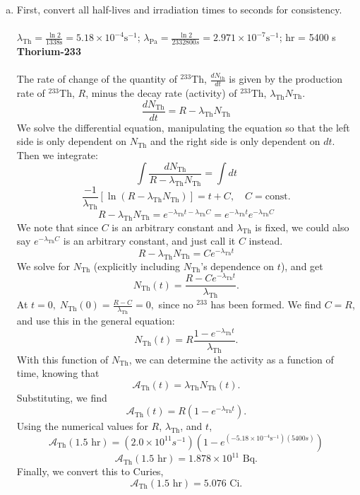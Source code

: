 \documentclass{report}
\begin{document}
\begin{enumerate}[a)]

\item

First, convert all half-lives and irradiation times to seconds for consistency.\\ 
\-\\
\tab $\lambda_{\text{Th}} = \frac{\ln{2}}{1338\text{s}} = 5.18\times10^{-4}\text{s}^{-1}$; \tab $\lambda_{\text{Pa}}=\frac{\ln{2}}{2332800s}=2.971\times10^{-7}\text{s}^{-1}$;  hr = 5400 s\\

\textbf{Thorium-233}\\
\-\\
The rate of change of the quantity of $^{233}$Th, $\frac{dN_{\text{th}}}{dt}$ is given by the production rate of $^{233}$Th, $R$, minus the decay rate (activity) of $^{233}$Th, $\lambda_{\text{Th}}N_{\text{Th}}$.
$$\frac{dN_{\text{Th}}}{dt} = R - \lambda_{\text{Th}}N_{\text{Th}}$$
We solve the differential equation, manipulating the equation so that the left side is only dependent on $N_{\text{Th}}$ and the right side is only dependent on $dt$. Then we integrate:
$$\int{\frac{dN_{\text{Th}}}{R-\lambda_{\text{Th}}N_{\text{Th}}}} = \int{dt}$$
$$\frac{-1}{\lambda_{\text{Th}}}[\ln(R-\lambda_{\text{Th}}N_{\text{Th}})] = t + C,\quad C=\text{const.}$$
$$R-\lambda_{\text{Th}}N_{\text{Th}} = e^{-\lambda_{\text{Th}}t -\lambda_{\text{Th}}C} = e^{-\lambda_{\text{Th}}t} e^{-\lambda_{\text{Th}}C}$$
We note that since $C$ is an arbitrary constant and $\lambda_{\text{Th}}$ is fixed, we could also say $e^{-\lambda_{\text{Th}}C}$ is an arbitrary constant, and just call it $C$ instead.
$$ R-\lambda_{\text{Th}}N_{\text{Th}} = Ce^{-\lambda_{\text{Th}}t} $$
We solve for $N_{\text{Th}}$ (explicitly including $N_{\text{Th}}$'s dependence on $t$), and get
$$ N_{\text{Th}}(t) = \frac{R - Ce^{-\lambda_{\text{Th}}t}}{\lambda_{\text{Th}}} .$$
At $t=0,\; N_{\text{Th}}(0) = \frac{R - C}{\lambda_{\text{Th}}}=0,$ since no $^{233}$ has been formed. We find $C= R$, and use this in the general equation:
$$ N_{\text{Th}}(t) = R\frac{1 - e^{-\lambda_{\text{Th}}t}}{\lambda_{\text{Th}}}. $$
With this function of $N_{\text{Th}}$, we can determine the activity as a function of time, knowing that
$$ \mathcal{A}_{\text{Th}}(t) = \lambda_{\text{Th}}N_{\text{Th}}(t). $$
Substituting, we find
$$ \mathcal{A}_{\text{Th}}(t) = R(1-e^{-\lambda_{\text{Th}}t}) .$$
Using the numerical values for $R$, $\lambda_{\text{Th}}$, and $t$,
$$ \mathcal{A}_{\text{Th}}(1.5\text{ hr}) =(2.0\times10^{11}s^{-1})(1-e^{(-5.18\times10^{-4}\text{s}^{-1})(5400s)}) $$
$$ \mathcal{A}_{\text{Th}}(1.5\text{ hr}) = 1.878\times10^{11}\text{ Bq} .$$
Finally, we convert this to Curies,
$$\boxed{ \mathcal{A}_{\text{Th}}(1.5\text{ hr}) = 5.076\text{ Ci} }.$$


\end{enumerate}
\end{document}
